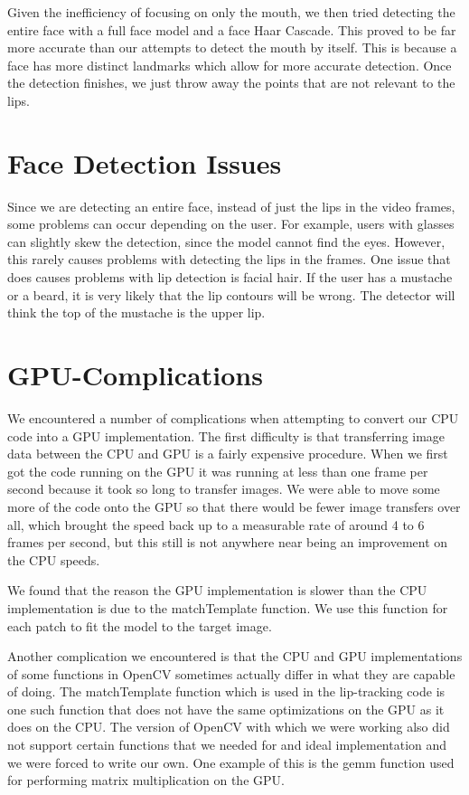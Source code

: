 Given the inefficiency of focusing on only the mouth, we then tried detecting the entire face with a full face model and a face Haar Cascade. This proved to be far more accurate than our attempts to detect the mouth by itself. This is because a face has more distinct landmarks which allow for more accurate detection. Once the detection finishes, we just throw away the points that are not relevant to the lips.

\section{Face Detection Issues}
Since we are detecting an entire face, instead of just the lips in the video frames, some problems can occur depending on the user. For example, users with glasses can slightly skew the detection, since the model cannot find the eyes. However, this rarely causes problems with detecting the lips in the frames. One issue that does causes problems with lip detection is facial hair. If the user has a mustache or a beard, it is very likely that the lip contours will be wrong. The detector will think the top of the mustache is the upper lip.

\section{GPU-Complications}

We encountered a number of complications when attempting to convert our CPU code into a GPU implementation. The first difficulty is that transferring image data between the CPU and GPU is a fairly expensive procedure. When we first got the code running on the GPU it was running at less than one frame per second because it took so long to transfer images. We were able to move some more of the code onto the GPU so that there would be fewer image transfers over all, which brought the speed back up to a measurable rate of around 4 to 6 frames per second, but this still is not anywhere near being an improvement on the CPU speeds.

We found that the reason the GPU implementation is slower than the CPU implementation is due to the matchTemplate function. We use this function for each patch to fit the model to the target image.

Another complication we encountered is that the CPU and GPU implementations of some functions in OpenCV sometimes actually differ in what they are capable of doing. The matchTemplate function which is used in the lip-tracking code is one such function that does not have the same optimizations on the GPU as it does on the CPU. The version of OpenCV with which we were working also did not support certain functions that we needed for and ideal implementation and we were forced to write our own. One example of this is the gemm function used for performing matrix multiplication on the GPU.